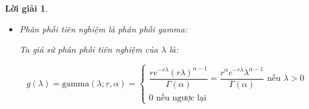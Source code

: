 \documentclass[14pt, a4paper]{article}
\theoremstyle{sltheorem}
\theoremstyle{soltheorem}
\newtheorem*{loigiai}{Lời giải}
\begin{document}
\begin{loigiai}
\begin{enumerate}
\begin{itemize}
            Ta tính bias của $\hat{\lambda}_2$:

            \begin{equation*}
                \text{bias}(\hat{\lambda}_2) = \mathbb{E} \lbrack \hat{\lambda}_2 \rbrack - \lambda = \dfrac{n\lambda}{n} - \lambda = 0
            \end{equation*}

            Như vậy $\lambda$ được ước lượng theo mode của phân phối hậu nghiệm là ước lượng không chệch của $\lambda$.

            Ta tính phương sai của $\hat{\lambda}_2$:

            \begin{equation*}
                \text{Var}(\hat{\lambda}_2) = \dfrac{\lambda}{n}
            \end{equation*}

            Như vậy sai số trung bình của ước lượng $\hat{\lambda}_2$:

            \begin{equation*}
                \text{MS}(\hat{\lambda}_2) = \text{Var}(\hat{\lambda}_2) + (\text{bias}(\hat{\lambda}_2))^2 = \dfrac{\lambda}{n} < \dfrac{\lambda}{n} + \dfrac{1}{n^2}
            \end{equation*}

            Như vậy ta thấy ước lượng $\lambda$ được ước lượng theo mode của phân phối hậu nghiệm vừa là ước lượng không chệch và là ước lượng hiệu quả hơn khi $\lambda$ được ước lượng theo trung bình của phân phối hậu nghiệm.
            Nên đối với ước lượng điểm, ta sẽ chọn ước lượng theo mode của phân phối hậu nghiệm.

            \item Phân phối tiên nghiệm là phân phối gamma:
            
            Ta giả sử phân phối tiên nghiệm của $\lambda$ là:

            \begin{equation*}
                g(\lambda) = \text{gamma}(\lambda; r, \alpha) = \begin{cases}
                    \dfrac{r e^{-r\lambda} (r\lambda)^{\alpha - 1}}{\Gamma(\alpha)}=\dfrac{r^{\alpha}e^{-r\lambda} \lambda^{\alpha - 1}}{\Gamma(\alpha)} \text{ nếu } \lambda > 0 \\
                    0 \text{ nếu ngược lại}
                \end{cases}
            \end{equation*}


\end{itemize}
\end{enumerate}
\end{loigiai}
\end{document}
